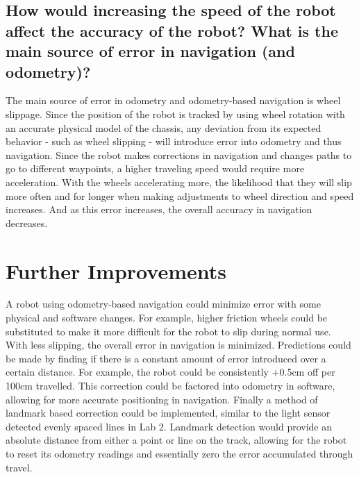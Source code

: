 \documentclass[11pt]{article}
\begin{document}
\subsection{How would increasing the speed of the robot affect the accuracy of the robot? What is
the main source of error in navigation (and odometry)?}
The main source of error in odometry and odometry-based navigation is wheel slippage. Since the position of the robot is tracked by using wheel rotation with an accurate physical model of the chassis, any deviation from its expected behavior - such as wheel slipping - will introduce error into odometry and thus navigation. Since the robot makes corrections in navigation and changes paths to go to different waypoints, a higher traveling speed would require more acceleration. With the wheels accelerating more, the likelihood that they will slip more often and for longer when making adjustments to wheel direction and speed increases. And as this error increases, the overall accuracy in navigation decreases.

\section{Further Improvements}
A robot using odometry-based navigation could minimize error with some physical and software changes. For example, higher friction wheels could be substituted to make it more difficult for the robot to slip during normal use. With less slipping, the overall error in navigation is minimized. Predictions could be made by finding if there is a constant amount of error introduced over a certain distance. For example, the robot could be consistently +0.5cm off per 100cm travelled. This correction could be factored into odometry in software, allowing for more accurate positioning in navigation. Finally a method of landmark based correction could be implemented, similar to the light sensor detected evenly spaced lines in Lab 2. Landmark detection would provide an absolute distance from either a point or line on the track, allowing for the robot to reset its odometry readings and essentially zero the error accumulated through travel.
\end{document}
